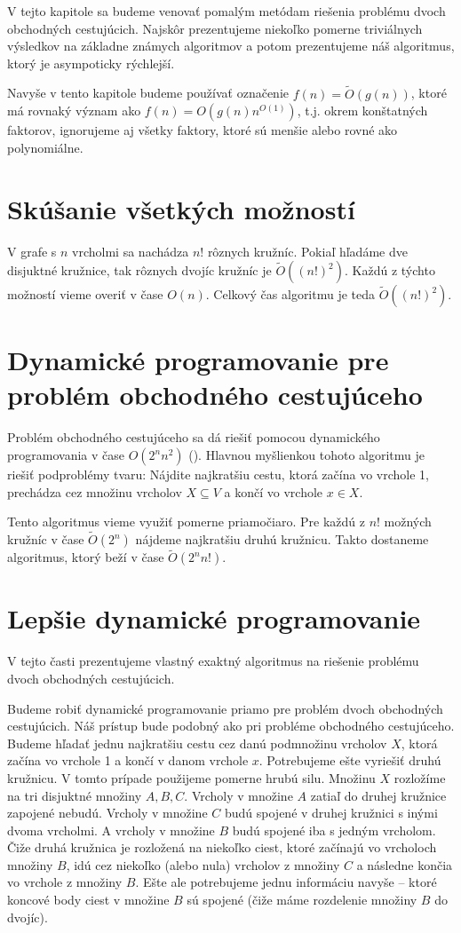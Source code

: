 V tejto kapitole sa budeme venovať pomalým metódam riešenia problému
dvoch obchodných cestujúcich. Najskôr prezentujeme niekoľko pomerne triviálnych
výsledkov na základne známych algoritmov a potom prezentujeme náš algoritmus, ktorý
je asympoticky rýchlejší.

Navyše v tento kapitole budeme používať označenie $f(n) = \tilde{O}(g(n))$, ktoré
má rovnaký význam ako $f(n) = O(g(n) n^{O(1)})$, t.j. okrem konštatných faktorov,
ignorujeme aj všetky faktory, ktoré sú menšie alebo rovné ako polynomiálne.

\section{Skúšanie všetkých možností}

V grafe s $n$ vrcholmi sa nachádza $n!$ rôznych kružníc. Pokiaľ hľadáme
dve disjuktné kružnice, tak rôznych dvojíc kružníc je $\tilde{O}((n!)^2)$.
Každú z týchto možností vieme overiť v čase $O(n)$. Celkový čas algoritmu
je teda $\tilde{O}((n!)^2)$.

\section{Dynamické programovanie pre problém obchodného cestujúceho}

Problém obchodného cestujúceho sa dá riešiť pomocou dynamického
programovania v čase $O(2^n n^2)$ (\cite{Held}). Hlavnou myšlienkou
tohoto algoritmu je riešiť podproblémy tvaru: Nájdite najkratšiu cestu, ktorá
začína vo vrchole 1, prechádza cez množinu vrcholov $X \subseteq V$ a končí vo vrchole
$x \in X$.

Tento algoritmus vieme využiť pomerne priamočiaro. Pre každú z $n!$ možných kružníc
v čase $\tilde{O}(2^n)$ nájdeme najkratšiu druhú kružnicu. Takto dostaneme
algoritmus, ktorý beží v čase $\tilde{O}(2^n n!)$. 

\section{Lepšie dynamické programovanie}

V tejto časti prezentujeme vlastný exaktný algoritmus na riešenie problému
dvoch obchodných cestujúcich.

Budeme robiť dynamické programovanie priamo pre problém
dvoch obchodných cestujúcich. Náš prístup bude podobný ako pri probléme
obchodného cestujúceho. 
Budeme hľadať jednu najkratšiu cestu cez danú podmnožinu vrcholov
$X$, ktorá začína vo vrchole 1 a končí v danom vrchole $x$. Potrebujeme ešte vyriešiť
druhú kružnicu. V tomto prípade použijeme pomerne hrubú silu.
Množinu $X$ rozložíme na tri disjuktné množiny $A, B, C$.
Vrcholy v množine $A$ zatiaľ do druhej kružnice zapojené nebudú. Vrcholy v množine
$C$ budú spojené v druhej kružnici s inými dvoma vrcholmi.
A vrcholy v množine $B$ budú spojené iba s jedným vrcholom. Čiže druhá kružnica je
rozložená na niekoľko ciest, ktoré začínajú vo vrcholoch množiny $B$, idú cez niekoľko
(alebo nula) vrcholov z množiny $C$ a následne končia vo vrchole z množiny $B$.
Ešte ale potrebujeme jednu informáciu navyše -- ktoré koncové body ciest v množine
$B$ sú spojené (čiže máme rozdelenie množiny $B$ do dvojíc).

